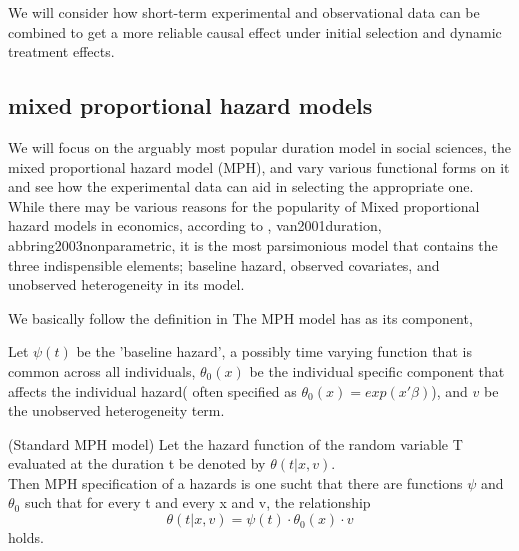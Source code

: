 \documentclass[uplatex,dvipdfmx]{jsarticle}
\begin{document}
We will consider how short-term experimental and observational data can be combined to get a more reliable causal effect under initial selection and dynamic treatment effects.

\subsection{mixed proportional hazard models}
 We will focus on the arguably most popular duration model in social sciences, the mixed proportional hazard model (MPH), and vary various functional forms on it and see how the experimental data can aid in selecting the appropriate one.\\
While there may be various reasons for the popularity of Mixed proportional hazard models in economics, according to \cite{heckman1984method}, van2001duration, abbring2003nonparametric, it is the most parsimonious model that contains the three indispensible elements; baseline hazard, observed covariates, 
and unobserved heterogeneity in its model. 

We basically follow the definition in \cite{van2001duration}
The MPH model has as its component, 

Let $\psi(t)$ be the 'baseline hazard', a possibly time varying function that is common across all individuals, $\theta_0(x)$ be the individual specific component that affects the individual hazard( often specified as $\theta_0(x)=exp(x'\beta)$), and $v$ be the unobserved heterogeneity term. 
\begin{definition}(Standard MPH model)
    \label{def:mph1}
    Let the hazard function of the random variable T evaluated at the duration t be denoted by $\theta(t|x,v)$.\\
    Then MPH specification of a hazards is one sucht that there are functions $\psi$ and $\theta_0 $ such that for every t and every x and v, the relationship 
    \begin{equation}
        \theta(t| x, v) = \psi(t) \cdot \theta_0 (x)\cdot v
    \end{equation}
    holds.
\end{definition}
\end{document}
